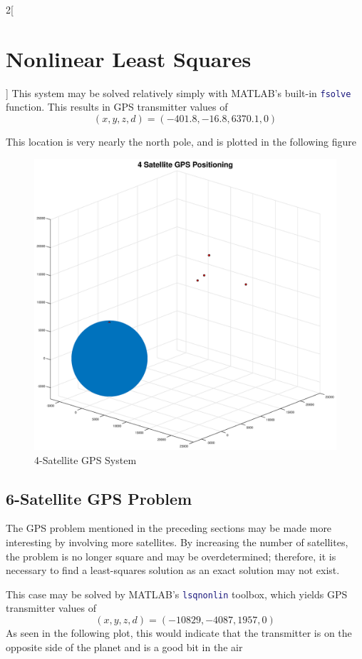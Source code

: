 \documentclass[10pt,a4paper]{article}
\begin{document}
\begin{multicols*}{2}[ \section*{Nonlinear Least Squares} ]
This system may be solved relatively simply with MATLAB's built-in \lstinline[language=matlab]|fsolve| function. This results in GPS transmitter values of 
$$
(x,y,z,d) = (-401.8, -16.8, 6370.1, 0)
$$

This location is very nearly the north pole, and is plotted in the following figure

\begin{figure}[H]
\includegraphics[width=\columnwidth]{Figures/4satgps.eps}
\caption{4-Satellite GPS System}
\label{fig: 4satgps}
\end{figure}

\subsection*{6-Satellite GPS Problem}

The GPS problem mentioned in the preceding sections may be made more interesting by involving more satellites. By increasing the number of satellites, the problem is no longer square and may be overdetermined; therefore, it is necessary to find a least-squares solution as an exact solution may not exist.

This case may be solved by MATLAB's \lstinline[language=matlab]|lsqnonlin| toolbox, which yields GPS transmitter values of
$$
(x, y, z, d) = (-10829, -4087, 1957, 0)
$$
As seen in the following plot, this would indicate that the transmitter is on the opposite side of the planet and is a good bit in the air


\end{multicols*}
\end{document}
